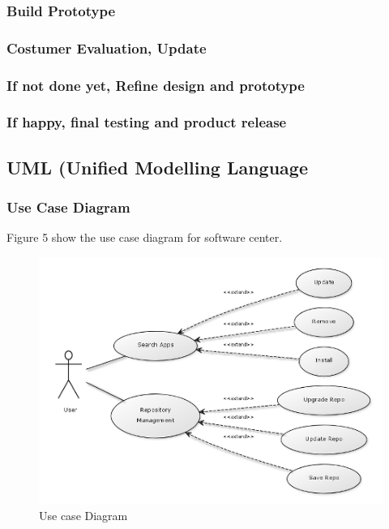 \documentclass[conference, letterpaper]{IEEEtran}
\begin{document}
\subsubsection{Build Prototype}

\subsubsection{Costumer Evaluation, Update}

\subsubsection{If not done yet, Refine design and prototype}

\subsubsection{If happy, final testing and product release}

\subsection{UML (Unified Modelling Language}

\subsubsection{Use Case Diagram}
Figure 5 show the use case diagram for software center.

\begin{figure}[hbtp]
\centering
\includegraphics[scale=0.7]{image/Usecase.png}
\caption{Use case Diagram}
\end{figure}
\end{document}
